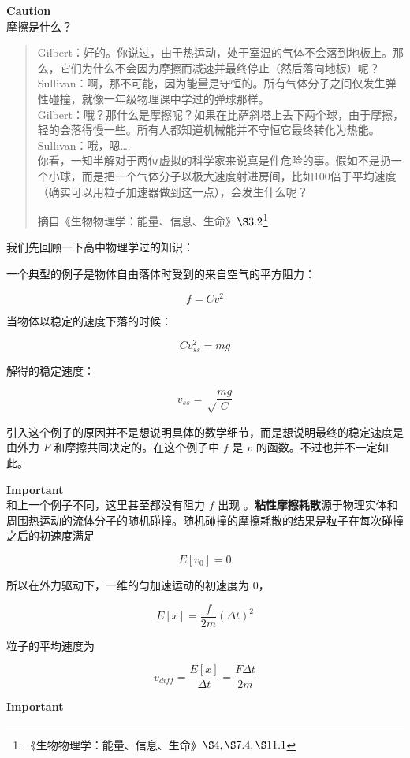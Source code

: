 \documentclass[
]{article}
\begin{document}
\textbf{Caution}\\

摩擦是什么？

\begin{quote}
Gilbert：好的。你说过，由于热运动，处于室温的气体不会落到地板上。那么，它们为什么不会因为摩擦而减速并最终停止（然后落向地板）呢？\\
Sullivan：啊，那不可能，因为能量是守恒的。所有气体分子之间仅发生弹性碰撞，就像一年级物理课中学过的弹球那样。
\\
Gilbert：哦？那什么是摩擦呢？如果在比萨斜塔上丢下两个球，由于摩擦，轻的会落得慢一些。所有人都知道机械能并不守恒它最终转化为热能。\\
Sullivan：哦，嗯\ldots.\\
你看，一知半解对于两位虚拟的科学家来说真是件危险的事。假如不是扔一个小球，而是把一个气体分子以极大速度射进房间，比如100倍于平均速度（确实可以用粒子加速器做到这一点），会发生什么呢？

摘自《生物物理学：能量、信息、生命》\(\S3.2\)\footnote{《生物物理学：能量、信息、生命》\(\S4,\S7.4,\S11.1\)}
\end{quote}

我们先回顾一下高中物理学过的知识：

一个典型的例子是物体自由落体时受到的来自空气的平方阻力：

\[f=Cv^2\]

当物体以稳定的速度下落的时候：

\[Cv_{ss}^2=mg\]

解得的稳定速度：

\[v_{ss}=\sqrt\frac{mg}{C}\]

引入这个例子的原因并不是想说明具体的数学细节，而是想说明最终的稳定速度是由外力
\(F\) 和摩擦共同决定的。在这个例子中 \(f\) 是 \(v\)
的函数。不过也并不一定如此。

\textbf{Important}\\

和上一个例子不同，这里甚至都没有阻力 \(f\) 出现
。\textbf{粘性摩擦耗散}源于物理实体和周围热运动的流体分子的随机碰撞。随机碰撞的摩擦耗散的结果是粒子在每次碰撞之后的初速度满足

\[E[v_0]=0\]

所以在外力驱动下，一维的匀加速运动的初速度为 \(0\)，

\[E[x]=\frac{f}{2m}(\Delta t)^2\]

粒子的平均速度为

\[v_{diff}=\frac{E[x]}{\Delta t}=\frac{F\Delta t}{2m}\]

\textbf{Important}\\
\end{document}
